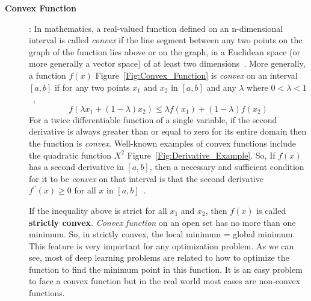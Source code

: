 \begin{description}
 \item [\textbf{Convex Function}]: In mathematics, a real-valued function defined on an n-dimensional interval is called \textit{convex} if the line segment between any two points on the graph of the function lies above or on the graph, in a Euclidean space (or more generally a vector space) of at least two dimensions~\cite{Wiki_Convex_Function}. More generally, a function $f(x)$ Figure~\ref{Fig:Convex_Function} is \textit{convex} on an interval $[a,b]$ if for any two points $x_1$ and $x_2$ in $[a,b]$ and any $\lambda$ where $0<\lambda<1$~\cite{Rudin_1976},%
%
\begin{equation}\label{eq:convex_fun}
 f(\lambda x_1 + (1-\lambda)x_2) \leq \lambda f(x_1) + (1 - \lambda) f(x_2)
\end{equation}%
%
For a twice differentiable function of a single variable, if the second derivative is always greater than or equal to zero for its entire domain then the function is \textit{convex}. Well-known examples of convex functions include the quadratic function $X^2$ Figure~\ref{Fig:Derivative_Example}. So, If $f(x)$ has a second derivative in $[a,b]$, then a necessary and sufficient condition for it to be \textit{convex} on that interval is that the second derivative $f^{''}(x) \geq 0$ for all $x$ in $[a,b]$~\cite{Wolfram_Convex}.

If the inequality above is strict for all $x_1$ and $x_2$, then $f(x)$ is called \textbf{strictly convex}. \textit{Convex function} on an open set has no more than one minimum. So, in strictly convex, the local minimum = global minimum. This feature is very important for any optimization problem. As we can see, most of deep learning problems are related to how to optimize the function to find the minimum point in this function.  It is an easy problem to face a convex function but in the real world most cases are non-convex functions.


\end{description}
